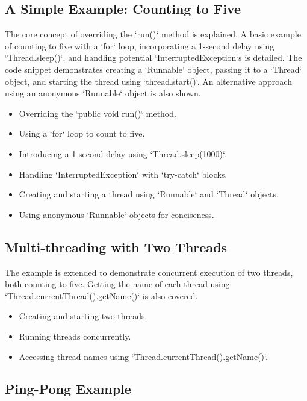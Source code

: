 \documentclass{article}
\begin{document}
\begin{itemize}
\subsection{A Simple Example: Counting to Five}

The core concept of overriding the `run()` method is explained.  A basic example of counting to five with a `for` loop, incorporating a 1-second delay using `Thread.sleep()`, and handling potential `InterruptedException`s is detailed. The code snippet demonstrates creating a `Runnable` object, passing it to a `Thread` object, and starting the thread using `thread.start()`.  An alternative approach using an anonymous `Runnable` object is also shown.

\begin{itemize}
    \item Overriding the `public void run()` method.
    \item Using a `for` loop to count to five.
    \item Introducing a 1-second delay using `Thread.sleep(1000)`.
    \item Handling `InterruptedException` with `try-catch` blocks.
    \item Creating and starting a thread using `Runnable` and `Thread` objects.
    \item Using anonymous `Runnable` objects for conciseness.
\end{itemize}


\subsection{Multi-threading with Two Threads}

The example is extended to demonstrate concurrent execution of two threads, both counting to five.  Getting the name of each thread using `Thread.currentThread().getName()` is also covered.

\begin{itemize}
    \item Creating and starting two threads.
    \item Running threads concurrently.
    \item Accessing thread names using `Thread.currentThread().getName()`.
\end{itemize}


\subsection{Ping-Pong Example}


\end{itemize}
\end{document}
